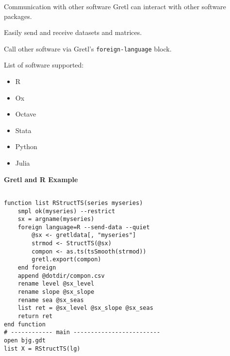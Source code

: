 \documentclass{beamer}[11pt]
\begin{document}
\begin{frame}{Communication with other software}
	Gretl can interact with other software packages.
	\medskip
	
	Easily send and receive datasets and matrices.
	\medskip
	
	Call other software via Gretl's \texttt{foreign-language} block.
	\medskip
	
	List of software supported:
	
	\begin{itemize}
		\item R
		\item Ox
		\item Octave
		\item Stata
		\item Python
		\item Julia
	\end{itemize}
\end{frame}


\begin{frame}[fragile]%
	\textbf{Gretl and R Example}
	\footnotesize
\begin{verbatim}

function list RStructTS(series myseries)
    smpl ok(myseries) --restrict
    sx = argname(myseries)
    foreign language=R --send-data --quiet
        @sx <- gretldata[, "myseries"]
        strmod <- StructTS(@sx)
        compon <- as.ts(tsSmooth(strmod))
        gretl.export(compon)
    end foreign
    append @dotdir/compon.csv
    rename level @sx_level
    rename slope @sx_slope
    rename sea @sx_seas
    list ret = @sx_level @sx_slope @sx_seas
    return ret
end function
# ------------ main -------------------------
open bjg.gdt
list X = RStructTS(lg)
\end{verbatim}
\end{frame}
\end{document}
